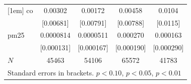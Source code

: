 \documentclass[11pt]{article}
\begin{document}
\begin{subappendices}
\begin{center}
{{\begin{tabular}{l*{4}{c}}
						[1em]
						co          &     0.00302         &     0.00172         &     0.00458         &      0.0104         \\
						&   [0.00681]         &   [0.00791]         &   [0.00788]         &    [0.0115]         \\
						[1em]
						pm25        &   0.0000814         &   0.0000511         &    0.000270         &    0.000163         \\
						&  [0.000131]         &  [0.000167]         &  [0.000190]         &  [0.000290]         \\
						\hline
						\(N\)       &       45463         &       54106         &       65572         &       41783         \\
						\hline\hline
				\multicolumn{5}{l}{\footnotesize Standard errors in brackets. \sym{*} \(p<0.10\), \sym{**} \(p<0.05\), \sym{***} \(p<0.01\)}\\
					\end{tabular}
				}
				
			}
		\end{center}
		

\end{subappendices}
\end{document}
